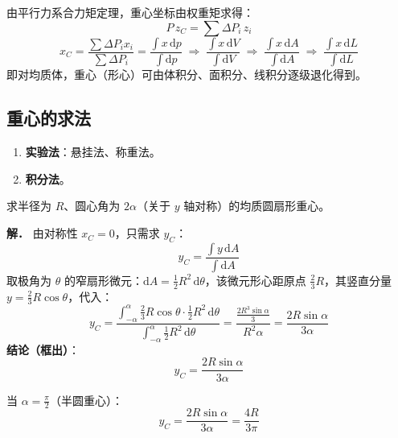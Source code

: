 由平行力系合力矩定理，重心坐标由权重矩求得：
\begin{equation}
P\,z_C=\sum\Delta P_i\,z_i
\label{eq:3-重心-z}
\end{equation}
\begin{equation}
x_C=\frac{\sum\Delta P_i x_i}{\sum\Delta P_i}
=\frac{\int x\,\mathrm{d}p}{\int\mathrm{d}p}
\;\Longrightarrow\;\frac{\int x\,\mathrm{d}V}{\int\mathrm{d}V}
\;\Longrightarrow\;\frac{\int x\,\mathrm{d}A}{\int\mathrm{d}A}
\;\Longrightarrow\;\frac{\int x\,\mathrm{d}L}{\int\mathrm{d}L}
\label{eq:3-重心-x}
\end{equation}
即对均质体，重心（形心）可由体积分、面积分、线积分逐级退化得到。

\subsection{重心的求法}

\begin{enumerate}
\item \textbf{实验法}：悬挂法、称重法。
\item \textbf{积分法}。
\end{enumerate}

\begin{example}[圆扇形重心]
求半径为 $R$、圆心角为 $2\alpha$（关于 $y$ 轴对称）的均质圆扇形重心。

\textbf{解．} 由对称性 $x_C=0$，只需求 $y_C$：
\begin{equation}
y_C=\frac{\int y\,\mathrm{d}A}{\int\mathrm{d}A}
\label{eq:3-重心-扇形}
\end{equation}
取极角为 $\theta$ 的窄扇形微元：$\mathrm{d}A=\tfrac12 R^2\,\mathrm{d}\theta$，该微元形心距原点 $\tfrac23 R$，其竖直分量 $y=\tfrac23 R\cos\theta$，代入：
\begin{equation}
y_C=
\frac{\displaystyle\int_{-\alpha}^{\alpha}\tfrac23 R\cos\theta\cdot\tfrac12 R^2\,\mathrm{d}\theta}
{\displaystyle\int_{-\alpha}^{\alpha}\tfrac12 R^2\,\mathrm{d}\theta}
=\frac{\displaystyle\tfrac{2R^3\sin\alpha}{3}}{R^2\alpha}
=\frac{2R\sin\alpha}{3\alpha}
\label{eq:3-重心-扇形结果}
\end{equation}
\textbf{结论（框出）}：
\begin{equation}
y_C=\frac{2R\sin\alpha}{3\alpha}
\label{eq:3-重心-扇形结论}
\end{equation}

当 $\alpha=\tfrac{\pi}{2}$（半圆重心）：
\begin{equation}
y_C=\frac{2R\sin\alpha}{3\alpha}=\frac{4R}{3\pi}
\label{eq:3-重心-半圆}
\end{equation}
\end{example}

